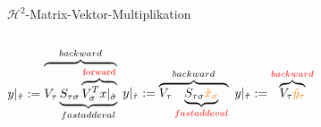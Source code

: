 \documentclass[10pt]{beamer}
\begin{document}
\begin{frame}{\(\mathcal{H}^2\)-Matrix-Vektor-Multiplikation}
  \begin{columns}
      \begin{overprint}
          \(y|_{\hat{\tau}} := \overbrace{V_{\tau} \underbrace{S_{\tau \sigma}
            \overbrace{V_{\sigma}^T
            x|_{\hat{\sigma}}}^{\textcolor{red}{\text{forward}}}}_{fastaddeval}}
            ^{backward}\)
          \(y|_{\hat{\tau}} := \overbrace{V_{\tau} \underbrace{S_{\tau \sigma}
            \textcolor{orange}{\hat{x}_\sigma}}_{\textcolor{red}{fastaddeval}}}
            ^{backward}\)
          \(y|_{\hat{\tau}} := \overbrace{V_{\tau}
            \textcolor{orange}{\hat{y}_\tau}}^{\textcolor{red}{backward}}\)
      \end{overprint}


\end{columns}
\end{frame}
\end{document}
